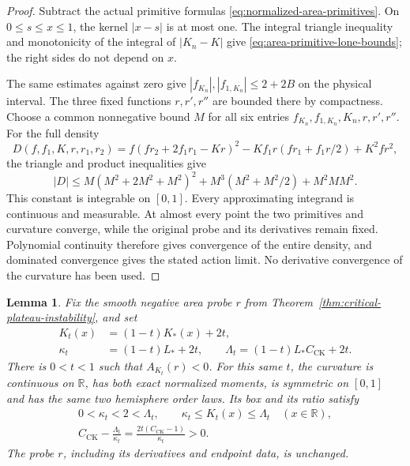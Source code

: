 \documentclass[11pt]{article}
\newtheorem{lemma}[theorem]{Lemma}
\newcommand{\R}{\mathbb R}
\begin{document}
\begin{proof}
Subtract the actual primitive formulas
\eqref{eq:normalized-area-primitives}. On $0\leq s\leq x\leq1$,
the kernel $|x-s|$ is at most one. The integral triangle inequality and
monotonicity of the integral of $|K_n-K|$ give
\eqref{eq:area-primitive-lone-bounds}; the right sides do not depend on $x$.

The same estimates against zero give
$|f_{K_n}|,|f_{1,K_n}|\leq2+2B$ on the physical interval.
The three fixed functions $r,r',r''$ are bounded there by compactness.
Choose a common nonnegative bound $M$ for all six entries
$f_{K_n},f_{1,K_n},K_n,r,r',r''$.
For the full density
\[
 D(f,f_1,K,r,r_1,r_2)
 =f(fr_2+2f_1r_1-Kr)^2-Kf_1r(fr_1+f_1r/2)+K^2fr^2,
\]
the triangle and product inequalities give
\[
 |D|\leq M(M^2+2M^2+M^2)^2
       +M^3(M^2+M^2/2)+M^2MM^2.
\]
This constant is integrable on $[0,1]$. Every approximating integrand is
continuous and measurable. At almost every point the two primitives and
curvature converge, while the original probe and its derivatives remain
fixed. Polynomial continuity therefore gives convergence of the entire
density, and dominated convergence gives the stated action limit.
No derivative convergence of the curvature has been used.
\end{proof}

\begin{lemma}\label{lem:strict-critical-contraction}
Fix the smooth negative area probe $r$ from
Theorem~\ref{thm:critical-plateau-instability}, and set
\begin{equation}\label{eq:critical-curvature-contraction}
 \begin{aligned}
 K_t(x)&=(1-t)K_*(x)+2t,\\
 \kappa_t&=(1-t)L_*+2t,\qquad
 \Lambda_t=(1-t)L_*C_{\mathrm{CK}}+2t.
 \end{aligned}
\end{equation}
There is $0<t<1$ such that $A_{K_t}(r)<0$.
For this same $t$, the curvature is continuous on $\R$, has both exact
normalized moments, is symmetric on $[0,1]$ and has the same two hemisphere
order laws. Its box and its ratio satisfy
\begin{equation}\label{eq:strict-contracted-box}
 \begin{gathered}
 0<\kappa_t<2<\Lambda_t,\qquad
 \kappa_t\leq K_t(x)\leq\Lambda_t\quad(x\in\R),\\
 C_{\mathrm{CK}}-\frac{\Lambda_t}{\kappa_t}
 =\frac{2t(C_{\mathrm{CK}}-1)}{\kappa_t}>0.
 \end{gathered}
\end{equation}
The probe $r$, including its derivatives and endpoint data, is unchanged.
\end{lemma}
\end{document}
